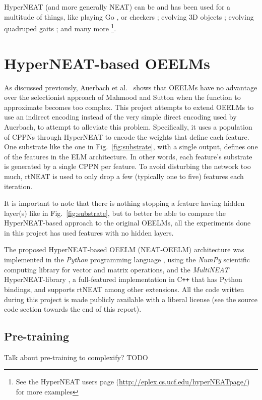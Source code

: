\documentclass[a4paper]{article}
\numberwithin{equation}{section}
\begin{document}
HyperNEAT (and more generally NEAT) can be and has been used for a multitude of
things, like playing Go \cite{gauci2010indirect}, or checkers
\cite{gauci2010autonomous}; evolving 3D objects \cite{clune2011evolving};
evolving quadruped gaits \cite{clune2009evolving}; and many more \footnote{See
the HyperNEAT users page (\url{http://eplex.cs.ucf.edu/hyperNEATpage/}) for
more examples}.

\section{HyperNEAT-based OEELMs}
As discussed previously, Auerbach et al.\ \cite{auerbach2014online} shows that
OEELMs have no advantage over the selectionist approach of Mahmood and Sutton
\cite{mahmood2013representation} when the function to approximate becomes too
complex. This project attempts to extend OEELMs to use an indirect encoding
instead of the very simple direct encoding used by Auerbach, to attempt to
alleviate this problem. Specifically, it uses a population of CPPNs through
HyperNEAT to encode the weights that define each feature. One substrate like the
one in Fig.~\ref{fig:substrate}, with a single output, defines one of the
features in the ELM architecture. In other words, each feature's substrate is
generated by a single CPPN per feature. To avoid disturbing the network too
much, rtNEAT is used to only drop a few (typically one to five) features each
iteration. 

It is important to note that there is nothing stopping a feature having hidden
layer(s) like in Fig.~\ref{fig:substrate}, but to better be able to compare the
HyperNEAT-based approach to the original OEELMs, all the experiments done in
this project has used features with no hidden layers.

The proposed HyperNEAT-based OEELM (NEAT-OEELM) architecture was implemented in
the \emph{Python} programming language \cite{van1995python}, using the
\emph{NumPy} \cite{van2011numpy} scientific computing library for vector and
matrix operations, and the \emph{MultiNEAT} HyperNEAT-library
\cite{chervenski2012multineat}, a full-featured implementation in C\verb!++!
that has Python bindings, and supports rtNEAT among other extensions. All the
code written during this project is made publicly available with a liberal
license (see the source code section towards the end of this report).


\subsection{Pre-training}
Talk about pre-training to complexify? TODO
\end{document}
